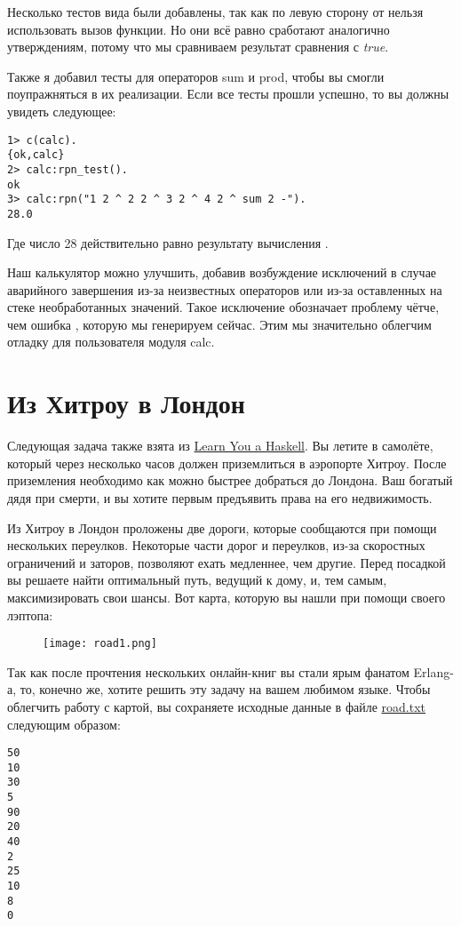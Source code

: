 Несколько тестов вида  были добавлены, так как по левую сторону от \ops{=\strut} нельзя использовать вызов функции.
Но они всё равно сработают аналогично утверждениям, потому что мы сравниваем результат сравнения с \emph{true}.

Также я добавил тесты для операторов sum и prod, чтобы вы смогли поупражняться в их реализации.
Если все тесты прошли успешно, то вы должны увидеть следующее:
\begin{lstlisting}[style=erlang]
1> c(calc).
{ok,calc}
2> calc:rpn_test().
ok
3> calc:rpn("1 2 ^ 2 2 ^ 3 2 ^ 4 2 ^ sum 2 -").
28.0
\end{lstlisting}

Где число 28 действительно равно результату вычисления .

Наш калькулятор можно улучшить, добавив возбуждение исключений  в случае аварийного завершения из\--за неизвестных операторов или из\--за оставленных на стеке необработанных значений.
Такое исключение обозначает проблему чётче, чем ошибка , которую мы генерируем сейчас.
Этим мы значительно облегчим отладку для пользователя модуля calc.

\section{Из Хитроу в Лондон}
\label{heathrow-to-london}
Следующая задача также взята из \href{http://learnyouahaskell.com/functionally-solving-problems#heathrow-to-london}{Learn You a Haskell}.
Вы летите в самолёте, который через несколько часов должен приземлиться в аэропорте Хитроу.
После приземления необходимо как можно быстрее добраться до Лондона.
Ваш богатый дядя при смерти, и вы хотите первым предъявить права на его недвижимость.

Из Хитроу в Лондон проложены две дороги, которые сообщаются при помощи нескольких переулков.
Некоторые части дорог и переулков, из\--за скоростных ограничений и заторов, позволяют ехать медленнее, чем другие.
Перед посадкой вы решаете найти оптимальный путь, ведущий к дому, и, тем самым, максимизировать свои шансы.
Вот карта, которую вы нашли при помощи своего лэптопа:
\begin{figure}[h!]
    \centering
    \texttt{[image: road1.png]}
\end{figure}

Так как после прочтения нескольких онлайн\--книг вы стали ярым фанатом Erlang\--а, то, конечно же, хотите решить эту задачу на вашем любимом языке.
Чтобы облегчить работу с картой, вы сохраняете исходные данные в файле \href{http://learnyousomeerlang.com/static/erlang/road.txt}{road.txt} следующим образом:
\begin{lstlisting}[style=erlang]
50
10
30
5
90
20
40
2
25
10
8
0
\end{lstlisting}

